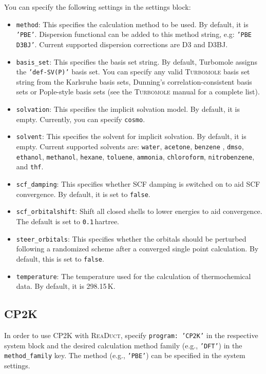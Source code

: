 \documentclass[]{tufte-book}
\begin{document}
You can specify the following settings in the settings block:
\begin{itemize}
\item \texttt{method}:
This specifies the calculation method to be used. By default, it is \texttt{'PBE'}. Dispersion functional can be added to this method string, e.g: \texttt{'PBE D3BJ'}. Current supported dispersion corrections are D3\cite{grimmeD3} and D3BJ.\cite{bjDamping}
\item \texttt{basis\_set}: This specifies the basis set string. By default, Turbomole assigns the \texttt{'def-SV(P)'} basis set. You can specify any valid \textsc{Turbomole} basis set string from the Karlsruhe basis sets\cite{karlsruheBasisSets}, Dunning's correlation-consistent basis sets\cite{dunningBasisSets} or Pople-style basis sets\cite{popleBasisSets} (see the \textsc{Turbomole} manual for a complete list).
\item \texttt{solvation}: This specifies the implicit solvation model. By default, it is empty. Currently, you can specify \texttt{cosmo}.
\item \texttt{solvent}: This specifies the solvent for implicit solvation. By default, it is empty. Current supported solvents are: \texttt{water}, \texttt{acetone}, \texttt{benzene}
, \texttt{dmso}, \texttt{ethanol}, \texttt{methanol}, \texttt{hexane}, \texttt{toluene}, \texttt{ammonia}, \texttt{chloroform}, \texttt{nitrobenzene}, and \texttt{thf}.
\item \texttt{scf\_damping}: This specifies whether SCF damping is switched on to aid SCF convergence.  By default, it is set to \texttt{false}.
\item \texttt{scf\_orbitalshift}: Shift all closed shells to lower energies to aid convergence. The default is set to \texttt{0.1}\,hartree.
\item \texttt{steer\_orbitals}: This specifies whether the orbitals should be perturbed  following a randomized scheme after a converged single point calculation\cite{orbitalperturbation}. By default, this is set to \texttt{false}.
\item \texttt{temperature}: The temperature used for the calculation of thermochemical data. By default, it is 298.15\,K.
\end{itemize}

\subsection{\textsc{CP2K}}

In order to use \textsc{CP2K} with \textsc{ReaDuct}, specify \texttt{program: 'CP2K'} in the respective system block and the desired
calculation method family (e.g., \texttt{'DFT'}) in the \texttt{method\_family} key.
The method (e.g., \texttt{'PBE'}) can be specified in the system settings.
\end{document}
